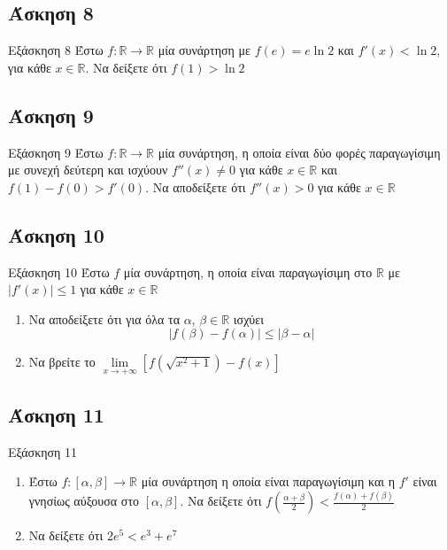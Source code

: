 \documentclass[greek]{beamer}
\begin{document}
\subsection{Άσκηση 8}
\begin{frame}[label=Άσκηση8]{Εξάσκηση 8}
  Έστω $f:\mathbb{R}\to\mathbb{R}$ μία συνάρτηση με $f(e)=e\ln 2$ και $f'(x)<\ln 2$, για κάθε $x\in \mathbb{R}$. Να δείξετε ότι $f(1)>\ln 2$

\end{frame}

\subsection{Άσκηση 9}
\begin{frame}[label=Άσκηση9]{Εξάσκηση 9}
  Έστω $f:\mathbb{R}\to\mathbb{R}$ μία συνάρτηση, η οποία είναι δύο φορές παραγωγίσιμη με συνεχή δεύτερη και ισχύουν $f''(x)\ne 0$ για κάθε $x\in\mathbb{R}$ και $f(1)-f(0)>f'(0)$. Να αποδείξετε ότι $f''(x)>0$ για κάθε $x\in\mathbb{R}$

\end{frame}

\subsection{Άσκηση 10}
\begin{frame}[label=Άσκηση10]{Εξάσκηση 10}
  Έστω $f$ μία συνάρτηση, η οποία είναι παραγωγίσιμη στο $\mathbb{R}$ με $|f'(x)|\le 1$ για κάθε $x\in\mathbb{R}$
  \begin{enumerate}
    \item<1-> Να αποδείξετε ότι για όλα τα $α$, $β\in\mathbb{R}$ ισχύει
      $$|f(β)-f(α)|\le |β-α|$$
    \item<2-> Να βρείτε το $\lim\limits_{x \to +\infty}{ \left[  f\left( \sqrt{x^2+1} \right)-f(x)  \right]}$
  \end{enumerate}
\end{frame}

\subsection{Άσκηση 11}
\begin{frame}[label=Άσκηση11]{Εξάσκηση 11}
  \begin{enumerate}
    \item<1-> Έστω $f:[α,β]\to\mathbb{R}$ μία συνάρτηση η οποία είναι παραγωγίσιμη και η $f'$ είναι γνησίως αύξουσα στο $[α,β]$. Να δείξετε ότι $f\left( \frac{α+β}{2} \right)<\frac{f(α)+f(β)}{2} $
    \item<2-> Να δείξετε ότι $2e^5<e^3+e^7$
  \end{enumerate}

\end{frame}
\end{document}
